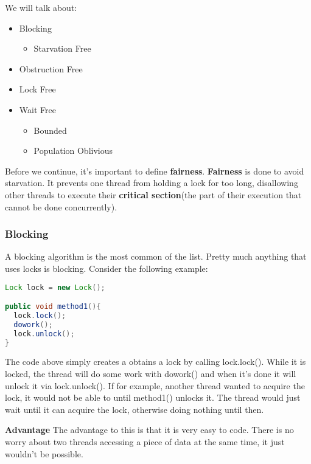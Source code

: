 \documentclass[letterpaper, 12pt]{article}
\begin{document}
We will talk about:

\begin{itemize}
	\item Blocking
	\begin{itemize}
		\item Starvation Free
	\end{itemize}
	\item Obstruction Free
	\item Lock Free
	\item Wait Free
	\begin{itemize}
		\item Bounded
		\item Population Oblivious
	\end{itemize}
\end{itemize}

\newpage

Before we continue, it's important to define {\bfseries fairness}. {\bfseries Fairness} 
is done to avoid starvation. It prevents one thread from holding a lock for too long, 
disallowing other threads to execute their {\bfseries critical section}(the part of 
their execution that cannot be done concurrently).

\subsubsection{Blocking}
A blocking algorithm is the most common of the list. Pretty much anything that uses locks is 
blocking. Consider the following example:

\begin{lstlisting}[language=Java]
Lock lock = new Lock();

public void method1(){
  lock.lock();
  dowork();
  lock.unlock();
}

\end{lstlisting}


The code above simply creates a obtains a lock by calling lock.lock(). While it is locked, 
the thread will do some work with dowork() and when it's done it will unlock it via 
lock.unlock(). If for example, another thread wanted to acquire the lock, it would not be 
able to until method1() unlocks it. The thread would just wait until it can acquire the 
lock, otherwise doing nothing until then.

\par\vspace{\baselineskip}

{\bfseries Advantage}\newline
The advantage to this is that it is very easy to code. There is no worry about two threads 
accessing a piece of data at the same time, it just wouldn't be possible.
\par\vspace{\baselineskip}
\end{document}
